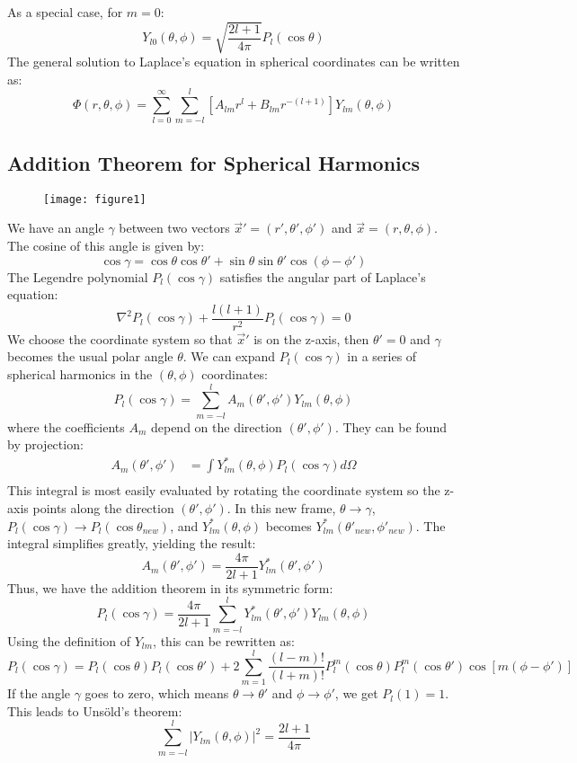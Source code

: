 \documentclass{article}
\begin{document}
	As a special case, for $m=0$:
	\[
	Y_{l0}(\theta, \phi) = \sqrt{\frac{2l+1}{4\pi}} P_l(\cos\theta)
	\]
	The general solution to Laplace's equation in spherical coordinates can be written as:
	\[
	\Phi(r, \theta, \phi) = \sum_{l=0}^{\infty} \sum_{m=-l}^{l} \left[ A_{lm}r^l + B_{lm}r^{-(l+1)} \right] Y_{lm}(\theta, \phi)
	\]
	
	\subsection{Addition Theorem for Spherical Harmonics}
	
	\begin{figure}[h]
		\centering
		\texttt{[image: figure1]}
		\caption{}
		\label{fig:figure5}
	\end{figure}
	
	We have an angle $\gamma$ between two vectors $\vec{x}'=(r', \theta', \phi')$ and $\vec{x}=(r, \theta, \phi)$.
	The cosine of this angle is given by:
	\[
	\cos\gamma = \cos\theta \cos\theta' + \sin\theta \sin\theta' \cos(\phi - \phi')
	\]
	The Legendre polynomial $P_l(\cos\gamma)$ satisfies the angular part of Laplace's equation:
	\[
	\nabla^2 P_l(\cos\gamma) + \frac{l(l+1)}{r^2} P_l(\cos\gamma) = 0
	\]
	We choose the coordinate system so that $\vec{x}'$ is on the z-axis, then $\theta'=0$ and $\gamma$ becomes the usual polar angle $\theta$. We can expand $P_l(\cos\gamma)$ in a series of spherical harmonics in the $(\theta, \phi)$ coordinates:
	\[
	P_l(\cos\gamma) = \sum_{m=-l}^{l} A_m(\theta', \phi') Y_{lm}(\theta, \phi)
	\]
	where the coefficients $A_m$ depend on the direction $(\theta', \phi')$. They can be found by projection:
	\begin{align*}
		A_m(\theta', \phi') &= \int Y_{lm}^*(\theta, \phi) P_l(\cos\gamma) d\Omega \\
	\end{align*}
	This integral is most easily evaluated by rotating the coordinate system so the z-axis points along the direction $(\theta', \phi')$. In this new frame, $\theta \to \gamma$, $P_l(\cos\gamma) \to P_l(\cos\theta_{new})$, and $Y_{lm}^*(\theta, \phi)$ becomes $Y_{lm}^*(\theta'_{new}, \phi'_{new})$. The integral simplifies greatly, yielding the result:
	\[
	A_m(\theta', \phi') = \frac{4\pi}{2l+1} Y_{lm}^*(\theta', \phi')
	\]
	Thus, we have the addition theorem in its symmetric form:
	\[
	P_l(\cos\gamma) = \frac{4\pi}{2l+1} \sum_{m=-l}^{l} Y_{lm}^*(\theta', \phi') Y_{lm}(\theta, \phi)
	\]
	Using the definition of $Y_{lm}$, this can be rewritten as:
	\[
	P_l(\cos\gamma) = P_l(\cos\theta) P_l(\cos\theta') + 2 \sum_{m=1}^{l} \frac{(l-m)!}{(l+m)!} P_l^m(\cos\theta) P_l^m(\cos\theta') \cos[m(\phi-\phi')]
	\]
	If the angle $\gamma$ goes to zero, which means $\theta \to \theta'$ and $\phi \to \phi'$, we get $P_l(1)=1$. This leads to Unsöld's theorem:
	\[
	\sum_{m=-l}^{l} |Y_{lm}(\theta, \phi)|^2 = \frac{2l+1}{4\pi}
	\]
	
\end{document}
